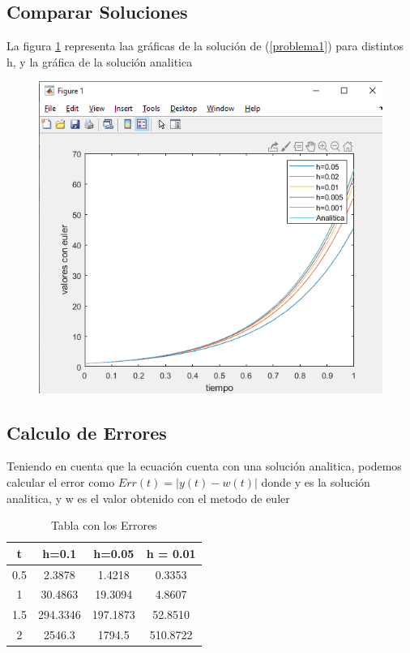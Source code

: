 \documentclass[12pt]{article}
\begin{document}
\subsection{Comparar Soluciones}
La figura \ref{graf2} representa laa gráficas de la solución de (\ref{problema1}) para distintos h, y la gráfica de la solución analitica
\begin{figure}[h]
	\centering
	\caption{}
	\includegraphics[scale=0.52]{graf2.png}
	\label{graf2}
\end{figure}
\subsection{Calculo de Errores}
Teniendo en cuenta que la ecuación cuenta con una solución analitica, podemos calcular el error como $Err(t) = |y(t)-w(t)|$ donde y es la solución analitica, y w es el valor obtenido con el metodo de euler
\begin{table}[h]
	\centering
	\begin{tabular}{|c|c|c|c|}
		\hline
		t & h=0.1 & h=0.05 & h = 0.01 \\
		\hline
		0.5&2.3878&1.4218&0.3353\\
		\hline
		1&30.4863&19.3094&4.8607\\
		\hline
		1.5&294.3346&197.1873&52.8510\\
		\hline
		2&2546.3&1794.5&510.8722\\
		\hline
	\end{tabular}
\caption{Tabla con los Errores}
\end{table}
\end{document}
